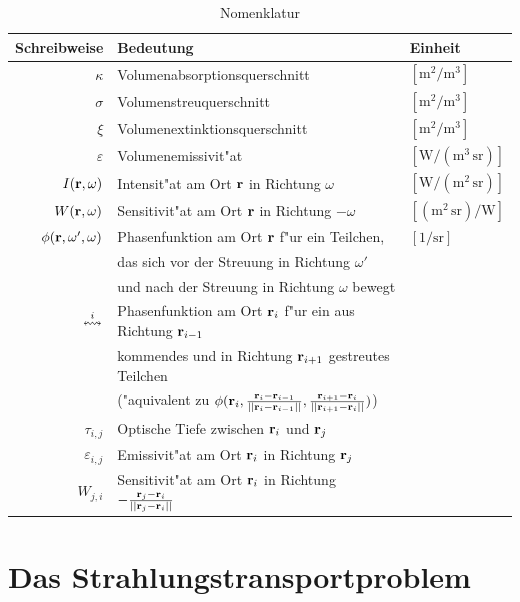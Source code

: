 \documentclass[11pt,a4paper,DIVcalc,BCOR8mm,titlepage,twoside]{scrartcl}
\begin{document}
	\begin{table}
		\caption{Nomenklatur}
		\begin{center}
		\begin{tabular}{rll}
			Schreibweise & Bedeutung & Einheit \\
			\hline
			$\kappa$ & Volumenabsorptionsquerschnitt & $\left[\text{m}^2/\text{m}^3\right]$ \\
			$\sigma$ & Volumenstreuquerschnitt & $\left[\text{m}^2/\text{m}^3\right]$ \\
			$\xi$ & Volumenextinktionsquerschnitt & $\left[\text{m}^2/\text{m}^3\right]$ \\
			$\varepsilon$ & Volumenemissivit"at & $\left[\text{W}/(\text{m}^3\,\text{sr})\right]$ \\
			$I(\mathbf{r},\omega)$ & Intensit"at am Ort $\mathbf{r}$ in Richtung $\omega$& $\left[\text{W}/(\text{m}^2\,\text{sr})\right]$ \\
			$W(\mathbf{r},\omega)$ & Sensitivit"at am Ort $\mathbf{r}$ in Richtung $-\omega$ & $\left[(\text{m}^2\,\text{sr})/\text{W}\right]$ \\
			$\phi(\mathbf{r},\omega',\omega)$ & Phasenfunktion am Ort $\mathbf{r}$ f"ur ein Teilchen, & $\left[1/\text{sr}\right]$ \\
				&das sich vor der Streuung in Richtung $\omega'$&\\
				&und nach der Streuung in Richtung $\omega$ bewegt& \\
			$\overset{i}{\leftrightsquigarrow}$ & Phasenfunktion am Ort $\mathbf{r}_i$ f"ur ein aus Richtung $\mathbf{r}_{i-1}$&\\ 
				&kommendes und in Richtung $\mathbf{r}_{i+1}$ gestreutes Teilchen&\\
				&("aquivalent zu $\phi(\mathbf{r}_i,\frac{\mathbf{r}_i-\mathbf{r}_{i-1}}{||\mathbf{r}_i-\mathbf{r}_{i-1}||},\frac{\mathbf{r}_{i+1}-\mathbf{r}_i}{||\mathbf{r}_{i+1}-\mathbf{r}_i||})$)& \\
			$\tau_{i,j}$ & Optische Tiefe zwischen $\mathbf{r}_i$ und $\mathbf{r}_j$ & \\
			$\varepsilon_{i,j}$ & Emissivit"at am Ort $\mathbf{r}_i$ in Richtung $\mathbf{r}_j$ & \\
			$W_{j,i}$ & Sensitivit"at am Ort $\mathbf{r}_i$ in Richtung $-\frac{\mathbf{r}_j-\mathbf{r}_i}{||\mathbf{r}_j-\mathbf{r}_i||}$ &
		\end{tabular}
		\end{center}
		\label{tab:nomenklatur}
	\end{table}
	
	
	\section{Das Strahlungstransportproblem}
	\label{sec:radiative_transfer}
	
\end{document}
